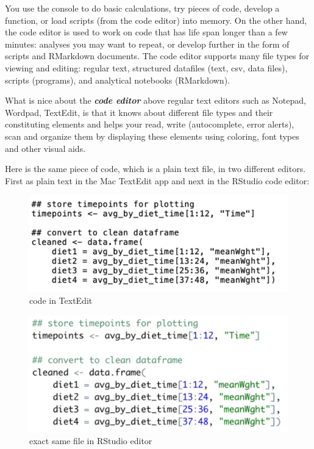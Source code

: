 \documentclass[]{book}
\begin{document}
You use the console to do basic calculations, try pieces of code, develop a function, or load scripts (from the code editor) into memory. On the other hand, the code editor is used to work on code that has life span longer than a few minutes: analyses you may want to repeat, or develop further in the form of scripts and RMarkdown documents.
The code editor supports many file types for viewing and editing: regular text, structured datafiles (text, csv, data files), scripts (programs), and analytical notebooks (RMarkdown).

What is nice about the \textbf{\emph{code editor}} above regular text editors such as Notepad, Wordpad, TextEdit, is that it knows about different file types and their constituting elements and helps your read, write (autocomplete, error alerts), scan and organize them by displaying these elements using coloring, font types and other visual aids.

Here is the same piece of code, which is a plain text file, in two different editors. First as plain text in the Mac TextEdit app and next in the RStudio code editor:

\begin{figure}
\centering
\includegraphics{figures/R_code_plain.png}
\caption{code in TextEdit}
\end{figure}

\begin{figure}
\centering
\includegraphics{figures/R_code_highlighted.png}
\caption{exact same file in RStudio editor}
\end{figure}
\end{document}
